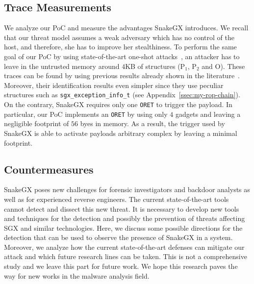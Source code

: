 \subsection{Trace Measurements}
\label{ssec:comparison}
We analyze our PoC and measure the advantages SnakeGX introduces.
We recall that our threat model assumes a weak adversary which has no control 
of the host, and therefore, she has to improve her stealthiness.
To perform the same goal of our PoC by using state-of-the-art one-shot 
attacks~\cite{biondo2018guard}, an attacker has to leave in the untrusted 
memory around $4$KB of structures (\ie P$_1$, P$_2$ and O).
These traces can be found by using previous results already shown in the 
literature~\cite{stancill2013check,polychronakis2011rop,kittel2015counteracting,Graziano:2016:RFA:2897845.2897894}.
Moreover, their identification results even simpler since
they use peculiar structures such as 
\texttt{sgx\_exception\_info\_t} (see Appendix~\ref{ssec:my-rop-chain}).
On the contrary, SnakeGX requires only one \texttt{ORET} to trigger the
payload.
In particular, our PoC implements an \texttt{ORET} by using only $4$ gadgets 
and leaving a negligible footprint of $56$ byes in memory. 
As a result, the trigger used by SnakeGX is able to activate payloads 
arbitrary complex by leaving a minimal footprint.

\subsection{Countermeasures}
\label{ssec:detection}

SnakeGX poses new challenges for forensic investigators and backdoor analysts 
as well as for experienced reverse engineers.
The current state-of-the-art tools cannot detect and dissect this new threat. 
It is necessary to develop 
new tools and techniques for the detection and possibly the prevention of 
threats affecting SGX and similar technologies.
Here, we discuss some possible directions for the detection that can be used to 
observe the presence of SnakeGX in a system.
Moreover, we analyze how the current state-of-the-art defenses
can mitigate our attack and which future research lines can be taken.
This is not a comprehensive study and we leave this part for future work.
We hope this research paves the way for new works in the malware analysis field.

